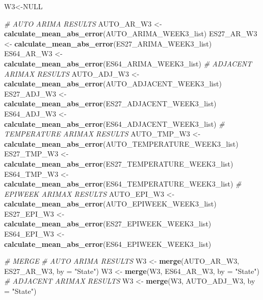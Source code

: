 \documentclass[
]{article}
\newenvironment{Shaded}{\begin{snugshade}}{\end{snugshade}}
\newcommand{\AttributeTok}[1]{\textcolor[rgb]{0.13,0.29,0.53}{#1}}
\newcommand{\CommentTok}[1]{\textcolor[rgb]{0.56,0.35,0.01}{\textit{#1}}}
\newcommand{\ConstantTok}[1]{\textcolor[rgb]{0.56,0.35,0.01}{#1}}
\newcommand{\FunctionTok}[1]{\textcolor[rgb]{0.13,0.29,0.53}{\textbf{#1}}}
\newcommand{\NormalTok}[1]{#1}
\newcommand{\OtherTok}[1]{\textcolor[rgb]{0.56,0.35,0.01}{#1}}
\newcommand{\StringTok}[1]{\textcolor[rgb]{0.31,0.60,0.02}{#1}}
\begin{document}
\begin{Shaded}
\begin{Highlighting}[]
\NormalTok{W3}\OtherTok{\textless{}{-}}\ConstantTok{NULL}

\CommentTok{\# AUTO ARIMA RESULTS}
\NormalTok{AUTO\_AR\_W3 }\OtherTok{\textless{}{-}} \FunctionTok{calculate\_mean\_abs\_error}\NormalTok{(AUTO\_ARIMA\_WEEK3\_list)}
\NormalTok{ES27\_AR\_W3 }\OtherTok{\textless{}{-}} \FunctionTok{calculate\_mean\_abs\_error}\NormalTok{(ES27\_ARIMA\_WEEK3\_list)}
\NormalTok{ES64\_AR\_W3 }\OtherTok{\textless{}{-}} \FunctionTok{calculate\_mean\_abs\_error}\NormalTok{(ES64\_ARIMA\_WEEK3\_list)}
\CommentTok{\# ADJACENT ARIMAX RESULTS}
\NormalTok{AUTO\_ADJ\_W3 }\OtherTok{\textless{}{-}} \FunctionTok{calculate\_mean\_abs\_error}\NormalTok{(AUTO\_ADJACENT\_WEEK3\_list)}
\NormalTok{ES27\_ADJ\_W3 }\OtherTok{\textless{}{-}} \FunctionTok{calculate\_mean\_abs\_error}\NormalTok{(ES27\_ADJACENT\_WEEK3\_list)}
\NormalTok{ES64\_ADJ\_W3 }\OtherTok{\textless{}{-}} \FunctionTok{calculate\_mean\_abs\_error}\NormalTok{(ES64\_ADJACENT\_WEEK3\_list)}
\CommentTok{\# TEMPERATURE ARIMAX RESULTS}
\NormalTok{AUTO\_TMP\_W3 }\OtherTok{\textless{}{-}} \FunctionTok{calculate\_mean\_abs\_error}\NormalTok{(AUTO\_TEMPERATURE\_WEEK3\_list)}
\NormalTok{ES27\_TMP\_W3 }\OtherTok{\textless{}{-}} \FunctionTok{calculate\_mean\_abs\_error}\NormalTok{(ES27\_TEMPERATURE\_WEEK3\_list)}
\NormalTok{ES64\_TMP\_W3 }\OtherTok{\textless{}{-}} \FunctionTok{calculate\_mean\_abs\_error}\NormalTok{(ES64\_TEMPERATURE\_WEEK3\_list)}
\CommentTok{\# EPIWEEK ARIMAX RESULTS}
\NormalTok{AUTO\_EPI\_W3 }\OtherTok{\textless{}{-}} \FunctionTok{calculate\_mean\_abs\_error}\NormalTok{(AUTO\_EPIWEEK\_WEEK3\_list)}
\NormalTok{ES27\_EPI\_W3 }\OtherTok{\textless{}{-}} \FunctionTok{calculate\_mean\_abs\_error}\NormalTok{(ES27\_EPIWEEK\_WEEK3\_list)}
\NormalTok{ES64\_EPI\_W3 }\OtherTok{\textless{}{-}} \FunctionTok{calculate\_mean\_abs\_error}\NormalTok{(ES64\_EPIWEEK\_WEEK3\_list)}

\CommentTok{\# MERGE}
\CommentTok{\# AUTO ARIMA RESULTS}
\NormalTok{W3 }\OtherTok{\textless{}{-}} \FunctionTok{merge}\NormalTok{(AUTO\_AR\_W3, ES27\_AR\_W3, }\AttributeTok{by =} \StringTok{"State"}\NormalTok{)}
\NormalTok{W3 }\OtherTok{\textless{}{-}} \FunctionTok{merge}\NormalTok{(W3, ES64\_AR\_W3, }\AttributeTok{by =} \StringTok{"State"}\NormalTok{)}
\CommentTok{\# ADJACENT ARIMAX RESULTS}
\NormalTok{W3 }\OtherTok{\textless{}{-}} \FunctionTok{merge}\NormalTok{(W3, AUTO\_ADJ\_W3, }\AttributeTok{by =} \StringTok{"State"}\NormalTok{)}
\end{Highlighting}
\end{Shaded}
\end{document}
